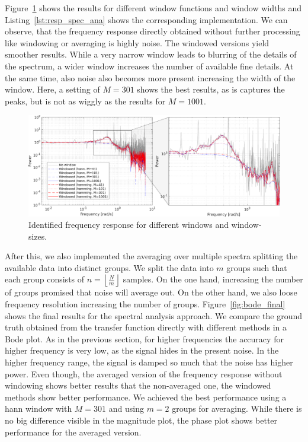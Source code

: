 \documentclass{scrartcl}
\begin{document}
Figure~\ref{fig:resp_spec_ana} shows the results for different window functions and window widths and Listing~\ref{lst:resp_spec_ana} shows the corresponding implementation.
We can observe, that the frequency response directly obtained without further processing like windowing or averaging is highly noise.
The windowed versions yield smoother results.
While a very narrow window leads to blurring of the details of the spectrum, a wider window increases the number of available fine details.
At the same time, also noise also becomes more present increasing the width of the window.
Here, a setting of $M=301$ shows the best results, as is captures the peaks, but is not as wiggly as the results for $M=1001$.
\begin{figure}[h]
	\centering
	\includegraphics[width=\textwidth]{figures/freq_resp_spec_ana.pdf}
	\caption{Identified frequency response for different windows and window-sizes.}
	\label{fig:resp_spec_ana}
\end{figure}

After this, we also implemented the averaging over multiple spectra splitting the available data into distinct groups.
We split the data into $m$ groups such that each group consists of $n = \left\lfloor\frac{N}{m}\right\rfloor$ samples.
On the one hand, increasing the number of groups promised that noise will average out.
On the other hand, we also loose frequency resolution increasing the number of groups.
Figure~\ref{fig:bode_final} shows the final results for the spectral analysis approach.
We compare the ground truth obtained from the transfer function directly with different methods in a Bode plot.
As in the previous section, for higher frequencies the accuracy for higher frequency is very low, as the signal hides in the present noise.
In the higher frequency range, the signal is damped so much that the noise has higher power.
Even though, the averaged version of the frequency response without windowing shows better results that the non-averaged one, the windowed methods show better performance.
We achieved the best performance using a hann window with $M=301$ and using $m=2$ groups for averaging.
While there is no big difference visible in the magnitude plot, the phase plot shows better performance for the averaged version.
\end{document}
